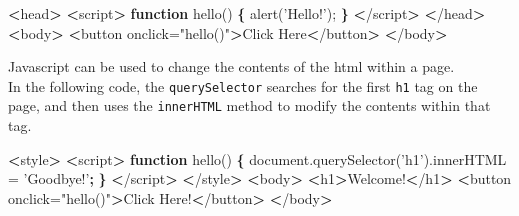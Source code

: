 \documentclass[]{book}
\newenvironment{Shaded}{\begin{snugshade}}{\end{snugshade}}
\newcommand{\ExtensionTok}[1]{#1}
\newcommand{\FunctionTok}[1]{\textcolor[rgb]{0.00,0.00,0.00}{#1}}
\newcommand{\KeywordTok}[1]{\textcolor[rgb]{0.13,0.29,0.53}{\textbf{#1}}}
\newcommand{\NormalTok}[1]{#1}
\newcommand{\OperatorTok}[1]{\textcolor[rgb]{0.81,0.36,0.00}{\textbf{#1}}}
\newcommand{\StringTok}[1]{\textcolor[rgb]{0.31,0.60,0.02}{#1}}
\begin{document}
\begin{Shaded}
\begin{Highlighting}[]
\OperatorTok{<}\FunctionTok{head}\OperatorTok{>}
    \OperatorTok{<}\ExtensionTok{script}\OperatorTok{>}
        \KeywordTok{function}\FunctionTok{ hello()} \KeywordTok{\{}
            \ExtensionTok{alert}\NormalTok{(}\StringTok{'Hello!'}\NormalTok{);}
        \KeywordTok{\}}
    \OperatorTok{<}\NormalTok{/}\ExtensionTok{script}\OperatorTok{>}
\OperatorTok{<}\NormalTok{/}\ExtensionTok{head}\OperatorTok{>}
\OperatorTok{<}\ExtensionTok{body}\OperatorTok{>}
    \OperatorTok{<}\ExtensionTok{button}\NormalTok{ onclick=}\StringTok{"hello()"}\OperatorTok{>}\NormalTok{Click Here}\OperatorTok{<}\NormalTok{/button}\OperatorTok{>}
\OperatorTok{<}\NormalTok{/}\ExtensionTok{body}\OperatorTok{>}
\end{Highlighting}
\end{Shaded}

Javascript can be used to change the contents of the html within a page.\\
In the following code, the \texttt{querySelector} searches for the first \texttt{h1} tag on the page, and then uses the \texttt{innerHTML} method to modify the contents within that tag.

\begin{Shaded}
\begin{Highlighting}[]
\OperatorTok{<}\ExtensionTok{style}\OperatorTok{>}
    \OperatorTok{<}\ExtensionTok{script}\OperatorTok{>}
        \KeywordTok{function}\FunctionTok{ hello()} \KeywordTok{\{}                                      
            \ExtensionTok{document.querySelector}\NormalTok{(}\StringTok{'h1'}\NormalTok{)}\ExtensionTok{.innerHTML}\NormalTok{ = }\StringTok{'Goodbye!'}\KeywordTok{;}
            \KeywordTok{\}}                                                       
    \OperatorTok{<}\NormalTok{/}\ExtensionTok{script}\OperatorTok{>}
\OperatorTok{<}\NormalTok{/}\ExtensionTok{style}\OperatorTok{>}
\OperatorTok{<}\ExtensionTok{body}\OperatorTok{>}
    \OperatorTok{<}\ExtensionTok{h1}\OperatorTok{>}\NormalTok{Welcome!}\OperatorTok{<}\NormalTok{/h1}\OperatorTok{>}                             
    \OperatorTok{<}\ExtensionTok{button}\NormalTok{ onclick=}\StringTok{"hello()"}\OperatorTok{>}\NormalTok{Click Here!}\OperatorTok{<}\NormalTok{/button}\OperatorTok{>}
\OperatorTok{<}\NormalTok{/}\ExtensionTok{body}\OperatorTok{>}
\end{Highlighting}
\end{Shaded}
\end{document}
